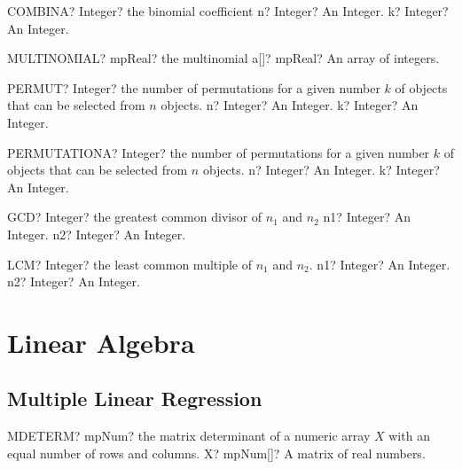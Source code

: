 \documentclass[12pt,a4paper,openany]{book}
\begin{document}
\begin{mpFunctionsExtract}
\mpWorksheetFunctionTwoNotImplemented
{COMBINA? Integer? the binomial coefficient}
{n? Integer? An Integer.}
{k? Integer? An Integer.}
\end{mpFunctionsExtract}

\begin{mpFunctionsExtract}
\mpWorksheetFunctionOneNotImplemented
{MULTINOMIAL? mpReal? the multinomial}
{a[]? mpReal? An array of integers.}
\end{mpFunctionsExtract}

\begin{mpFunctionsExtract}
\mpWorksheetFunctionTwoNotImplemented
{PERMUT? Integer? the number of permutations for a given number $k$ of objects that can be selected from $n$ objects.}
{n? Integer? An Integer.}
{k? Integer? An Integer.}
\end{mpFunctionsExtract}

\begin{mpFunctionsExtract}
\mpWorksheetFunctionTwoNotImplemented
{PERMUTATIONA? Integer? the number of permutations for a given number $k$ of objects that can be selected from $n$ objects.}
{n? Integer? An Integer.}
{k? Integer? An Integer.}
\end{mpFunctionsExtract}

\begin{mpFunctionsExtract}
\mpWorksheetFunctionTwoNotImplemented
{GCD? Integer? the greatest common divisor of $n_1$ and $n_2$}
{n1? Integer? An Integer.}
{n2? Integer? An Integer.}
\end{mpFunctionsExtract}

\begin{mpFunctionsExtract}
\mpWorksheetFunctionTwoNotImplemented
{LCM? Integer? the least common multiple of $n_1$ and $n_2$.}
{n1? Integer? An Integer.}
{n2? Integer? An Integer.}
\end{mpFunctionsExtract}

\chapter{Linear Algebra}

\section{Multiple Linear Regression}

\begin{mpFunctionsExtract}
\mpWorksheetFunctionOneNotImplemented
{MDETERM? mpNum? the matrix determinant of a numeric array $X$ with an equal number of rows and columns.}
{X? mpNum[]? A matrix of real numbers.}
\end{mpFunctionsExtract}
\end{document}
